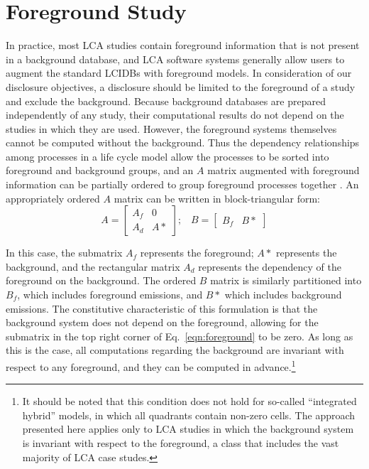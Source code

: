 \section{Foreground Study}

In practice, most LCA studies contain foreground information that is not present in a background database, and LCA software systems generally allow users to augment the standard LCIDBs with foreground models.  In consideration of our disclosure objectives, a disclosure should be limited to the foreground of a study and exclude the background.  Because background databases are prepared independently of any study, their computational results do not depend on the studies in which they are used.  However, the foreground systems themselves cannot be computed without the background.  Thus the dependency relationships among processes in a life cycle model allow the processes to be sorted into foreground and background groups, and an $A$ matrix augmented with foreground information can be partially ordered to group foreground processes together \citep{Kuczenski_JLCA_2015}.  An appropriately ordered $A$ matrix can be written in block-triangular form:
\begin{equation}
A = \left[\begin{array}{cc}
A_f & 0 \\
A_d &  A*
  \end{array}
\right];\;\;\;  B = \left[\begin{array}{cc} B_f & B*   \end{array}\right]
\label{eqn:foreground}
\end{equation}


In this case, the submatrix $A_f$ represents the foreground; $A*$ represents the background, and the rectangular matrix $A_d$ represents the dependency of the foreground on the background.  The ordered $B$ matrix is similarly partitioned into $B_f$, which includes foreground emissions, and $B*$ which includes background emissions. The constitutive characteristic of this formulation is that the background system does not depend on the foreground, allowing for the submatrix in the top right corner of Eq.~\ref{eqn:foreground} to be zero.  As long as this is the case, all computations regarding the background are invariant with respect to any foreground, and they can be computed in advance.\footnote{It should be noted that this condition does not hold for so-called ``integrated hybrid'' models, in which all quadrants contain non-zero cells.  The approach presented here applies only to LCA studies in which the background system is invariant with respect to the foreground, a class that includes the vast majority of LCA case studes.}  
